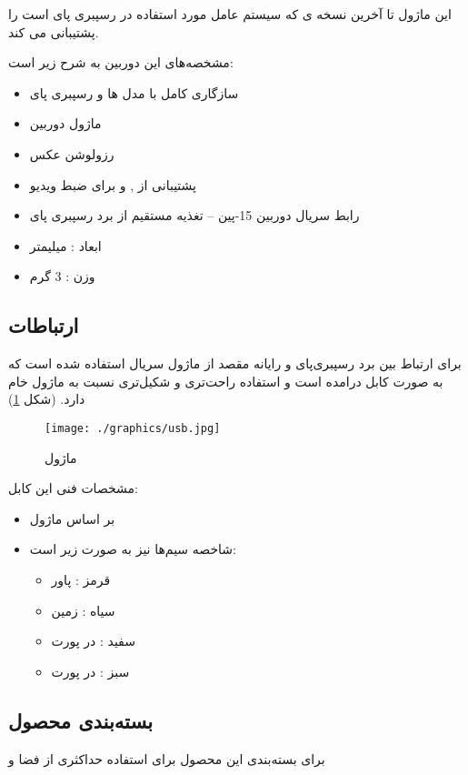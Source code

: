 \documentclass{article}
\begin{document}
این ماژول تا آخرین نسخه ی  که سیستم عامل مورد استفاده در رسپبری پای است را پشتیبانی می کند.

مشخصه‌های این دوربین به شرح زیر است:
\begin{itemize}
	\item سازگاری کامل با مدل ها  و  رسپبری پای
	\item ماژول دوربین 
	\item رزولوشن عکس 
	\item پشتیبانی از  ,  و   برای ضبط ویدیو
	\item رابط سریال دوربین 15-پین   – تغذیه مستقیم از برد رسپبری پای
	\item ابعاد :   میلیمتر
	\item وزن : 3 گرم
\end{itemize}		

\subsection{ارتباطات}
برای ارتباط بین برد رسپبری‌پای و رایانه مقصد از ماژول سریال  استفاده
شده است که به صورت کابل درامده است و استفاده راحت‌تری و شکیل‌تری نسبت به ماژول خام دارد.
(شکل \ref{usb})

\begin{figure}
	\centering
	\texttt{[image: ./graphics/usb.jpg]}
	\caption{ماژول }
	\label{usb}
\end{figure}

 مشخصات فنی این کابل:
 \begin{itemize}
 	\item بر اساس ماژول 
 	\item شاخصه‌ سیم‌ها نیز به صورت زیر است:
 	\begin{itemize}[*]
 		\item قرمز : پاور
 		\item سیاه : زمین
 		\item سفید :  در پورت 
 		\item سبز :   در پورت 
 	\end{itemize}
 \end{itemize}

\subsection{بسته‌بندی محصول}
برای بسته‌بندی این محصول برای استفاده حداکثری از فضا و 
\end{document}
